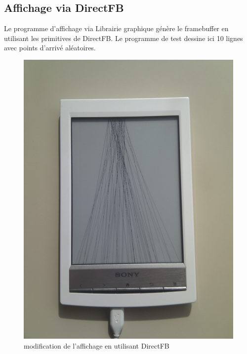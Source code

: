 \subsection{Affichage via DirectFB}

Le programme d'affichage via Librairie graphique génère le framebuffer en utilisant les primitives de DirectFB.
Le programme de test dessine ici 10 lignes avec points d'arrivé aléatoires.

	\begin{figure}[h!]
		\begin{center}
			\includegraphics[scale=0.15]{screen_direct.jpg}
			\caption{modification de l'affichage en utilisant DirectFB}
		\end{center}
	\end{figure}

